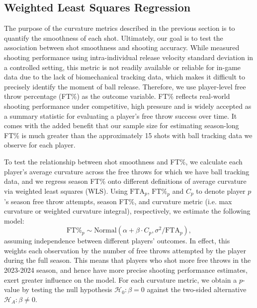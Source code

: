 \documentclass{article}
\begin{document}
    \subsection{Weighted Least Squares Regression}

      The purpose of the curvature metrics described in the previous section is to quantify the smoothness of each shot. Ultimately, our goal is to test the association between shot smoothness and shooting accuracy. While \citet{slegers_role_2024} measured shooting performance using intra-individual release velocity standard deviation in a controlled setting, this metric is not readily available or reliable for in-game data due to the lack of biomechanical tracking data, which makes it difficult to precisely identify the moment of ball release. Therefore, we use player-level free throw percentage (FT\%) as the outcome variable. FT\% reflects real-world shooting performance under competitive, high pressure and is widely accepted as a summary statistic for evaluating a player’s free throw success over time. It comes with the added benefit that our sample size for estimating season-long FT\% is much greater than the approximately 15 shots with ball tracking data we observe for each player.

      To test the relationship between shot smoothness and FT\%, we calculate each player's average curvature across the free throws for which we have ball tracking data, and we regress season FT\% onto different definitions of average curvature via weighted least squares (WLS). Using \(\mbox{FTA}_p\), \(\mbox{FT\%}_p\) and \(C_p\) to denote player $p$'s season free throw attempts, season FT\%, and curvature metric (i.e. max curvature or weighted curvature integral), respectively, we estimate the following model:
      \begin{equation}
      \label{eqn:weighted-least-squares}
        \mbox{FT\%}_p \sim \mbox{Normal}(\alpha + \beta \cdot C_p, \sigma^2 / \mbox{FTA}_p),
      \end{equation}
      assuming independence between different players' outcomes. In effect, this weights each observation by the number of free throws attempted by the player during the full season. This means that players who shot more free throws in the 2023-2024 season, and hence have more precise shooting performance estimates, exert greater influence on the model. For each curvature metric, we obtain a $p$-value by testing the null hypothesis $\mathcal{H}_0: \beta = 0$ against the two-sided alternative $\mathcal{H}_A: \beta \ne 0$.
    
\end{document}
